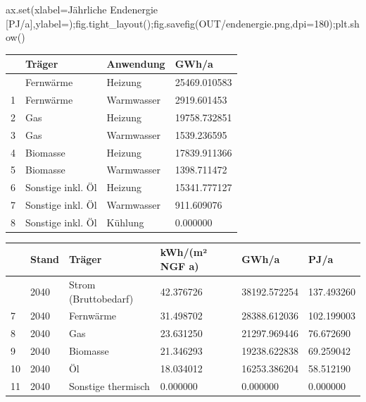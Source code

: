 \documentclass[
  ngerman,
  a4paper,
  DIV=11]{scrreprt}
\newenvironment{Shaded}{\begin{snugshade}}{\end{snugshade}}
\newcommand{\BuiltInTok}[1]{\textcolor[rgb]{0.00,0.23,0.31}{#1}}
\newcommand{\DecValTok}[1]{\textcolor[rgb]{0.68,0.00,0.00}{#1}}
\newcommand{\NormalTok}[1]{\textcolor[rgb]{0.00,0.23,0.31}{#1}}
\newcommand{\OperatorTok}[1]{\textcolor[rgb]{0.37,0.37,0.37}{#1}}
\newcommand{\StringTok}[1]{\textcolor[rgb]{0.13,0.47,0.30}{#1}}
\newcounter{none} %
\begin{document}
\begin{Shaded}
\begin{Highlighting}[]
\NormalTok{ax.}\BuiltInTok{set}\NormalTok{(xlabel}\OperatorTok{=}\StringTok{\textquotesingle{}Jährliche Endenergie [PJ/a]\textquotesingle{}}\NormalTok{,ylabel}\OperatorTok{=}\StringTok{\textquotesingle{}\textquotesingle{}}\NormalTok{)}\OperatorTok{;}\NormalTok{fig.tight\_layout()}\OperatorTok{;}\NormalTok{fig.savefig(OUT}\OperatorTok{/}\StringTok{\textquotesingle{}endenergie.png\textquotesingle{}}\NormalTok{,dpi}\OperatorTok{=}\DecValTok{180}\NormalTok{)}\OperatorTok{;}\NormalTok{plt.show()}
\end{Highlighting}
\end{Shaded}

{\def\LTcaptype{none} %
\begin{longtable}[]{@{}llll@{}}
\toprule\noalign{}
& Träger & Anwendung & GWh/a \\
\midrule\noalign{}
\endhead
\bottomrule\noalign{}
\endlastfoot
0 & Fernwärme & Heizung & 25469.010583 \\
1 & Fernwärme & Warmwasser & 2919.601453 \\
2 & Gas & Heizung & 19758.732851 \\
3 & Gas & Warmwasser & 1539.236595 \\
4 & Biomasse & Heizung & 17839.911366 \\
5 & Biomasse & Warmwasser & 1398.711472 \\
6 & Sonstige inkl. Öl & Heizung & 15341.777127 \\
7 & Sonstige inkl. Öl & Warmwasser & 911.609076 \\
8 & Sonstige inkl. Öl & Kühlung & 0.000000 \\
\end{longtable}
}

{\def\LTcaptype{none} %
\begin{longtable}[]{@{}llllll@{}}
\toprule\noalign{}
& Stand & Träger & kWh/(m² NGF a) & GWh/a & PJ/a \\
\midrule\noalign{}
\endhead
\bottomrule\noalign{}
\endlastfoot
6 & 2040 & Strom (Bruttobedarf) & 42.376726 & 38192.572254 &
137.493260 \\
7 & 2040 & Fernwärme & 31.498702 & 28388.612036 & 102.199003 \\
8 & 2040 & Gas & 23.631250 & 21297.969446 & 76.672690 \\
9 & 2040 & Biomasse & 21.346293 & 19238.622838 & 69.259042 \\
10 & 2040 & Öl & 18.034012 & 16253.386204 & 58.512190 \\
11 & 2040 & Sonstige thermisch & 0.000000 & 0.000000 & 0.000000 \\
\end{longtable}
}
\end{document}
